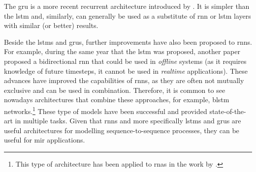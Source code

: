 

The \gls{gru} is a more recent recurrent architecture
introduced by \textcite{cho2014learning}. It is simpler than
the \gls{lstm} and, similarly, can generally be used as a
substitute of \gls{rnn} or \gls{lstm} layers with similar
(or better) results.

Beside the \glspl{lstm} and \glspl{gru}, further
improvements have also been proposed to \glspl{rnn}. For
example, during the same year that the \gls{lstm} was
proposed, another paper proposed a bidirectional \gls{rnn}
that could be used in \emph{offline} systems (as it requires
knowledge of future timesteps, it cannot be used in
\emph{realtime} applications). These advances have improved
the capabilities of \glspl{rnn}, as they are often not
mutually exclusive and can be used in combination.
Therefore, it is common to see nowadays architectures that
combine these approaches, for example, \gls{blstm}
networks.\footnote{This type of architecture has been
applied to \glspl{rna} in the work by
\textcite{chen2018functional}.} These type of models have
been successful and provided state-of-the-art in multiple
tasks. Given that \glspl{rnn} and more specifically
\glspl{lstm} and \glspl{gru} are useful architectures for
modelling sequence-to-sequence processes, they can be useful
for \gls{mir} applications.
